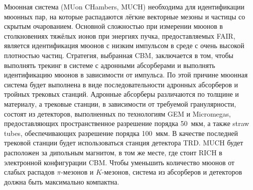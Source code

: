 \begin{minipage}[b]{0.495\textwidth}
Мюонная система (MUon CHambers, MUCH) необходима для идентификации мюонных пар, на которые распадаются лёгкие векторные мезоны и частицы со скрытым очарованием.
Основной сложностью при измерении мюонов в столкновениях тяжёлых ионов при энергиях пучка, предоставляемых FAIR, является идентификация мюонов с низким импульсом в среде с очень высокой плотностью частиц. Стратегия, выбранная CBM, заключается в том, чтобы выполнять трекинг в системе с адронными абсорберами и выполнять идентификацию мюонов в зависимости от импульса. По этой причине мюонная система будет выполнена в виде последовательности адронных абсорберов и тройных трековых станций. Адронные абсорберы различаются по толщине и материалу, а трековые станции, в зависимости от требуемой гранулярности, состоят из детекторов, выполненных по технологиям GEM и Micromegas, предоставляющих пространственное разрешение порядка 50~мкм, а также straw tubes, обеспечивающих разрешение порядка 100~мкм. В качестве последней трековой станции будет использоваться станция детектора TRD. MUCH будет расположен за дипольным магнитом, в том же месте, где стоит RICH в электронной конфигурации CBM. Чтобы уменьшить количество мюонов от слабых распадов $\pi$-мезонов и $K$-мезонов, система из абсорберов и детекторов должна быть максимально компактна. %
\end{minipage}
